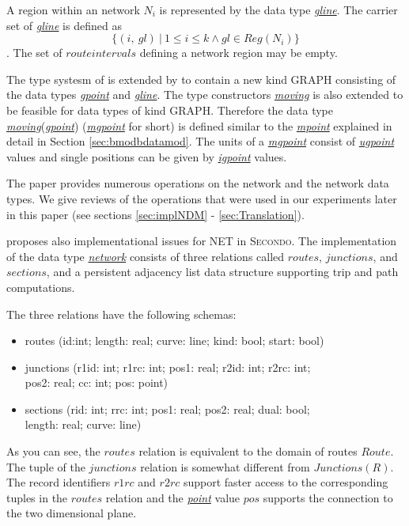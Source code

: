 \documentclass[a4paper]{article}
\newcommand{\secondo}{\textsc{Secondo}}
\newcommand{\dt}[1]{\textsl{\underline{#1}}}
\begin{document}
A region within an network $N_i$ is represented by the data type \dt{gline}.
The carrier set of \dt{gline} is defined as
\[\{(i,\ gl)\ |\ 1 \leq i \leq k \wedge gl \in Reg(N_i) \}\].
The set of $route intervals$ defining a network region may be empty.

The type systesm of \cite{RepresentingMovingObjectsGueting} is extended by
\cite{NetworkGueting} to contain a new kind GRAPH consisting of the data types
\dt{gpoint} and \dt{gline}. The type constructors \dt{moving} is also extended
to be feasible for data types of kind GRAPH. Therefore the data type
\dt{moving}(\dt{gpoint}) (\dt{mgpoint} for short) is defined similar to the
\dt{mpoint} explained in detail in Section \ref{sec:bmodbdatamod}. The units of
a \dt{mgpoint} consist of \dt{ugpoint} values and single positions can be given
by \dt{igpoint} values.

The paper provides numerous operations on the network and the network data types.
We give reviews of the operations that were used in our experiments later in this
paper (see sections \ref{sec:implNDM} - \ref{sec:Translation}).

\cite{NetworkGueting} proposes also implementational issues for NET in
\secondo{}. The implementation of the data type \dt{network} consists of three
relations called $routes$, $junctions$, and $sections$, and a persistent adjacency
list data structure supporting trip and path computations.

The three relations have the following schemas:
\begin{ttfamily}
\begin{itemize}
  \item [] routes (id:int; length: real; curve: line; kind: bool; start: bool)
  \item [] junctions (r1id: int; r1rc: int; pos1: real; r2id: int; r2rc: int;\\
pos2: real; cc: int; pos: point)
  \item [] sections (rid: int; rrc: int; pos1: real; pos2: real; dual: bool;\\
length: real; curve: line)
\end{itemize}
\end{ttfamily}
As you can see, the $routes$ relation is equivalent to the domain of routes $Route$.
The tuple of the $junctions$ relation is somewhat different from $Junctions(R)$.
The record identifiers $r1rc$ and $r2rc$ support faster access to the corresponding
tuples in the $routes$ relation and the \dt{point} value $pos$ supports the connection
to the two dimensional plane.
\end{document}
